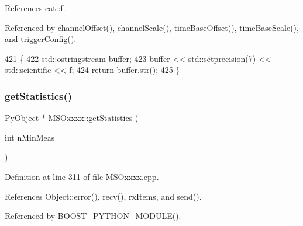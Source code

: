 References cat\+::f.



Referenced by channel\+Offset(), channel\+Scale(), time\+Base\+Offset(), time\+Base\+Scale(), and trigger\+Config().


\begin{DoxyCode}
421 \{
422     std::ostringstream buffer;
423     buffer << std::setprecision(7) << std::scientific << \hyperlink{namespacecat_ac4e5e84140346d3c05a72261c63ef7b1}{f};
424     \textcolor{keywordflow}{return} buffer.str();
425 \}
\end{DoxyCode}
\mbox{\label{classMSOxxxx_a38f15b6ad8bc3cdc1836d784b3e96c59}} 
\subsubsection{\texorpdfstring{get\+Statistics()}{getStatistics()}}
{\footnotesize\ttfamily Py\+Object $\ast$ M\+S\+Oxxxx\+::get\+Statistics (\begin{DoxyParamCaption}\item[{int}]{n\+Min\+Meas }\end{DoxyParamCaption})}



Definition at line 311 of file M\+S\+Oxxxx.\+cpp.



References Object\+::error(), recv(), rx\+Items, and send().



Referenced by B\+O\+O\+S\+T\+\_\+\+P\+Y\+T\+H\+O\+N\+\_\+\+M\+O\+D\+U\+L\+E().


